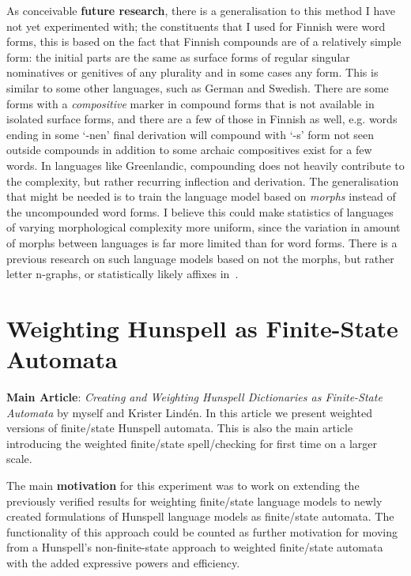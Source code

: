 \documentclass[officiallayout]{unihelcompling}
\begin{document}
As conceivable \textbf{future research}, there is a generalisation to this
method I have not yet experimented with; the constituents that I used for
Finnish were word forms, this is based on the fact that Finnish compounds are
of a relatively simple form: the initial parts are the same as surface forms of
regular singular nominatives or genitives of any plurality and in some cases
any form. This is similar to some other languages, such as German and Swedish.
There are some forms with a \emph{compositive} marker in compound forms that is
not available in isolated surface forms, and there are a few of those in
Finnish as well, e.g.\/ words ending in some `-nen' final derivation will
compound with `-s' form not seen outside compounds in addition to some archaic
compositives exist for a few words.  In languages like Greenlandic, compounding
does not heavily contribute to the complexity, but rather recurring inflection
and derivation. The generalisation that might be needed is to train the
language model based on \emph{morphs} instead of the uncompounded word forms.
I believe this could make statistics of languages of varying morphological
complexity more uniform, since the variation in amount of morphs between
languages is far more limited than for word forms. There is a previous research
on such language models based on not the morphs, but rather letter n-graphs, or
statistically likely affixes in~\citet{creutz2005morfessor}.


\section{Weighting Hunspell as Finite-State Automata}
\label{sec:hunspell-training}

\textbf{Main Article}: \emph{Creating and Weighting Hunspell Dictionaries as
Finite-State Automata} by myself and Krister Lindén. In this article we present
weighted versions of finite\-/state Hunspell automata. This is also the main
article introducing the weighted finite\-/state spell\-/checking for first time
on a larger scale.

The main \textbf{motivation} for this experiment was to work on extending the
previously verified results for weighting finite\-/state language models to newly
created formulations of Hunspell language models as finite\-/state automata. The
functionality of this approach could be counted as further motivation for
moving from a Hunspell's non-finite-state approach to weighted finite\-/state automata with
the added expressive powers and efficiency.
\end{document}
